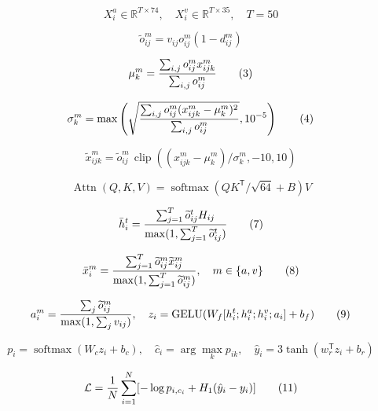 \begin{equation}
X_i^a\in\mathbb{R}^{T\times74},\quad X_i^v\in\mathbb{R}^{T\times35},\quad T=50\tag{1}
\end{equation}

\begin{equation}
\widetilde{o}_{ij}^{m}=v_{ij}o_{ij}^{m}(1-d_{ij}^{m})\tag{2}
\end{equation}

\begin{equation}
\mu_k^m={\sum_{i,j}o_{ij}^m x_{ijk}^m\over\sum_{i,j}o_{ij}^m}\tag{3}
\end{equation}

\begin{equation}
\sigma_k^m=\max\left(\sqrt{{\sum_{i,j}o_{ij}^m(x_{ijk}^m-\mu_k^m)^2\over\sum_{i,j}o_{ij}^m}},10^{-5}\right)\tag{4}
\end{equation}

\begin{equation}
\widetilde{x}_{ijk}^{m}=\widetilde{o}_{ij}^{m}\,\operatorname{clip}((x_{ijk}^{m}-\mu_k^m)/\sigma_k^m,-10,10)\tag{5}
\end{equation}

\begin{equation}
\operatorname{Attn}(Q,K,V)=\operatorname{softmax}(QK^{\mathsf T}/\sqrt{64}+B)V\tag{6}
\end{equation}

\begin{equation}
\bar h_i^t={\sum_{j=1}^T\widetilde{o}_{ij}^t H_{ij}\over\max(1,\sum_{j=1}^T\widetilde{o}_{ij}^t)}\tag{7}
\end{equation}

\begin{equation}
\bar x_i^m={\sum_{j=1}^T\widetilde{o}_{ij}^m\widetilde{x}_{ij}^m\over\max(1,\sum_{j=1}^T\widetilde{o}_{ij}^m)},\quad m\in\{a,v\}\tag{8}
\end{equation}

\begin{equation}
a_i^m={\sum_j\widetilde{o}_{ij}^m\over\max(1,\sum_jv_{ij})},\quad z_i=\operatorname{GELU}(W_f[h_i^t;h_i^a;h_i^v;a_i]+b_f)\tag{9}
\end{equation}

\begin{equation}
p_i=\operatorname{softmax}(W_cz_i+b_c),\quad\hat c_i=\arg\max_kp_{ik},\quad\hat y_i=3\tanh(w_r^{\mathsf T}z_i+b_r)\tag{10}
\end{equation}

\begin{equation}
\mathcal L={1\over N}\sum_{i=1}^N[-\log p_{i,c_i}+H_1(\hat y_i-y_i)]\tag{11}
\end{equation}

